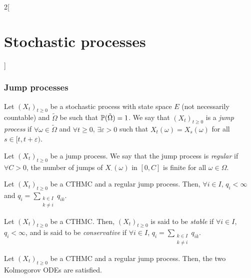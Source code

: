 \documentclass[../../../main_math.tex]{subfiles}
\begin{document}
\begin{multicols}{2}[\section{Stochastic processes}]
  \subsubsection{Jump processes}
  \begin{definition}
    Let ${(X_t)}_{t\geq 0}$ be a stochastic process with state space $E$ (not necessarily countable) and $\tilde\Omega$ be such that $\mathbb{P}(\tilde{\Omega})=1$. We say that ${(X_t)}_{t\geq 0}$ is a \emph{jump process} if $\forall \omega \in \tilde{\Omega}$ and $\forall t\geq 0$, $\exists \varepsilon>0$ such that $X_t(\omega)=X_{s}(\omega)$ for all $s\in[t,t+\varepsilon)$.
  \end{definition}
  \begin{definition}
    Let ${(X_t)}_{t\geq 0}$ be a jump process. We say that the jump process is \emph{regular} if $\forall C>0$, the number of jumps of $X_{\cdot}(\omega)$ in $[0,C]$ is finite for all $\omega\in\Omega$.
  \end{definition}
  \begin{theorem}
    Let ${(X_t)}_{t\geq 0}$ be a CTHMC and a regular jump process. Then, $\forall i\in I$, $q_i<\infty$ and $q_i=\sum_{\substack{k\in I\\k\ne i}}q_{ik}$.
  \end{theorem}
  \begin{definition}
    Let ${(X_t)}_{t\geq 0}$ be a CTHMC. Then, ${(X_t)}_{t\geq 0}$ is said to be \emph{stable} if $\forall i\in I$, $q_i<\infty$, and is said to be \emph{conservative} if $\forall i\in I$, $q_i=\sum_{\substack{k\in I\\k\ne i}}q_{ik}$.
  \end{definition}
  \begin{theorem}
    Let ${(X_t)}_{t\geq 0}$ be a CTHMC and a regular jump process. Then, the two Kolmogorov ODEs are satisfied.
  \end{theorem}

\end{multicols}
\end{document}
